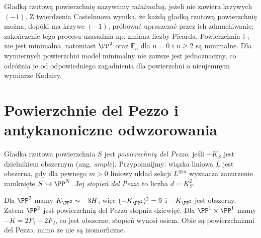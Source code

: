 \begin{uwaga}
Gładką rzutową powierzchnię nazywamy \emph{minimalną},
jeżeli nie zawiera krzywych $(-1)$. Z twierdzenia
Castelnuova wynika, że każdą gładką rzutową powierzchnię
można, dopóki ma krzywe $(-1)$, próbować upraszczać
przez ich zdmuchiwanie; zakończenie tego procesu
uzasadnia np. zmiana liczby Picarda. Powierzchnia
$\mathbb F_1$ nie jest minimalna, natomiast
$\PP^2$ oraz $\mathbb F_n$ dla $n=0$ i $n\ge2$
są minimalne. Dla wymiernych powierzchni model minimalny
nie zawsze jest jednoznaczny, co odróżnia je od
odpowiedniego zagadnienia dla powierzchni o nieujemnym
wymiarze Kodairy.
\end{uwaga}

\section{Powierzchnie del Pezzo i antykanoniczne odwzorowania}
\label{sec:ga6-delpezzo}

\begin{definicja}
Gładka rzutowa powierzchnia $S$ jest \emph{powierzchnią
del Pezzo}, jeśli $-K_S$ jest dzielnikiem obszernym
(ang. \emph{ample}). Przypomnijmy: wiązka liniowa $L$
jest obszerna, gdy dla pewnego $m>0$ liniowy układ
sekcji $L^{\otimes m}$ wyznacza zanurzenie zamknięte
$S\hookrightarrow\PP^N$. Jej \emph{stopień del Pezzo}
to liczba $d=K_S^2$.
\end{definicja}

\begin{przyklad}
Dla $\PP^2$ mamy $K_{\PP^2}\sim-3H$,
więc $(-K_{\PP^2})^2=9$ i $-K_{\PP^2}$ jest
obszerny. Zatem $\PP^2$ jest powierzchnią del Pezzo
stopnia dziewięć. Dla $\PP^1\times\PP^1$
mamy $-K=2F_1+2F_2$, co jest obszerne;
stopień wynosi osiem. Obie są powierzchniami
del Pezzo, mimo że nie są izomorficzne.
\end{przyklad}

